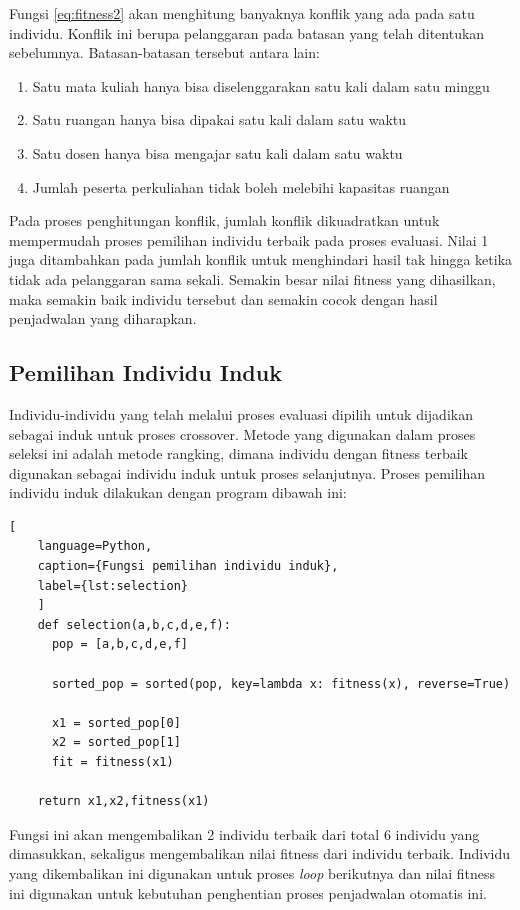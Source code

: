   Fungsi \ref{eq:fitness2} akan menghitung banyaknya konflik yang ada pada satu individu. Konflik ini berupa pelanggaran pada batasan yang telah ditentukan sebelumnya.
  Batasan-batasan tersebut antara lain:
  \begin{enumerate}[nolistsep]
    \item Satu mata kuliah hanya bisa diselenggarakan satu kali dalam satu minggu
    \item Satu ruangan hanya bisa dipakai satu kali dalam satu waktu
    \item Satu dosen hanya bisa mengajar satu kali dalam satu waktu
    \item Jumlah peserta perkuliahan tidak boleh melebihi kapasitas ruangan
  \end{enumerate} 
 Pada proses penghitungan konflik, jumlah konflik dikuadratkan untuk mempermudah proses pemilihan individu terbaik pada proses evaluasi. 
 Nilai 1 juga ditambahkan pada jumlah konflik untuk menghindari hasil tak hingga ketika tidak ada pelanggaran sama sekali. 
 Semakin besar nilai fitness yang dihasilkan, maka semakin baik individu tersebut dan semakin cocok dengan hasil penjadwalan yang diharapkan. 
\subsection{Pemilihan Individu Induk}
  
  Individu-individu yang telah melalui proses evaluasi dipilih untuk dijadikan sebagai \linebreak induk untuk proses crossover.
  Metode yang digunakan dalam proses seleksi ini adalah metode \linebreak rangking, dimana individu dengan fitness terbaik digunakan sebagai individu induk untuk proses selanjutnya. 
  Proses pemilihan individu induk dilakukan dengan program dibawah ini:
  \begin{lstlisting}[
    language=Python,
    caption={Fungsi pemilihan individu induk},
    label={lst:selection}
    ]
    def selection(a,b,c,d,e,f):
      pop = [a,b,c,d,e,f]

      sorted_pop = sorted(pop, key=lambda x: fitness(x), reverse=True)
      
      x1 = sorted_pop[0]
      x2 = sorted_pop[1]
      fit = fitness(x1)

    return x1,x2,fitness(x1)
  \end{lstlisting}
  Fungsi ini akan mengembalikan 2 individu terbaik dari total 6 individu yang dimasukkan, sekaligus mengembalikan nilai fitness dari individu terbaik. 
  Individu yang dikembalikan ini digunakan untuk proses \emph{loop} berikutnya dan nilai fitness ini digunakan untuk kebutuhan penghentian proses penjadwalan otomatis ini.

